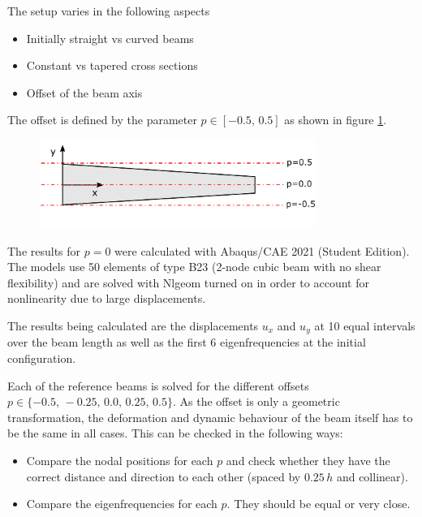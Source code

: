 The setup varies in the following aspects

\begin{itemize}
\item Initially straight vs curved beams
\item Constant vs tapered cross sections
\item Offset of the beam axis
\end{itemize}

The offset is defined by the parameter $p \in [-0.5,\,0.5]$ as shown in figure \ref{fig:verification:reference-beam-p}.

\begin{figure}[H]
\centering
\includegraphics[width=0.8\textwidth]{figures/verification/reference-beam-p}
\label{fig:verification:reference-beam-p}
\end{figure}

The results for $p = 0$ were calculated with Abaqus/CAE 2021 (Student Edition).
The models use 50 elements of type B23 (2-node cubic beam with no shear flexibility) and are solved with Nlgeom turned on in order to account for nonlinearity due to large displacements.

The results being calculated are the displacements $u_x$ and $u_y$ at 10 equal intervals over the beam length as well as the first 6 eigenfrequencies at the initial configuration.

Each of the reference beams is solved for the different offsets $p \in \{-0.5,\,-0.25,\,0.0,\,0.25,\,0.5\}$.
As the offset is only a geometric transformation, the deformation and dynamic behaviour of the beam itself has to be the same in all cases.
This can be checked in the following ways:

\begin{itemize}
\item Compare the nodal positions for each $p$ and check whether they have the correct distance and direction to each other (spaced by $0.25\,h$ and collinear).
\item Compare the eigenfrequencies for each $p$. They should be equal or very close.
\end{itemize}

